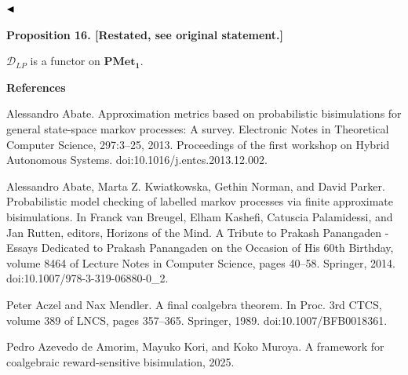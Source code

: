 \documentclass[10pt,a4paper]{article}
\begin{document}
$\hfill\blacktriangleleft$\par
 
 
 
 
\par\medskip\noindent\textbf{Proposition 16. [Restated, see original statement.]}\par
 
 
$\mathcal{D}_{LP}$ is a functor on $\mathbf{PMet_{1}}$.\par
 
 
 
 


 
\par\medskip\noindent\textbf{References}\par
  
\par\noindent  [1]  Alessandro Abate.  Approximation metrics based on probabilistic bisimulations for general state-space markov processes: A survey.  Electronic Notes in Theoretical Computer Science, 297:3–25, 2013.  Proceedings of the first workshop on Hybrid Autonomous Systems.  doi:10.1016/j.entcs.2013.12.002.  
 
\par\noindent  [2]  Alessandro Abate, Marta Z. Kwiatkowska, Gethin Norman, and David Parker.  Probabilistic model checking of labelled markov processes via finite approximate bisimulations.  In Franck van Breugel, Elham Kashefi, Catuscia Palamidessi, and Jan Rutten, editors, Horizons of the Mind. A Tribute to Prakash Panangaden - Essays Dedicated to Prakash Panangaden on the Occasion of His 60th Birthday, volume 8464 of Lecture Notes in Computer Science, pages 40–58. Springer, 2014.  doi:10.1007/978-3-319-06880-0\_2.  
 
\par\noindent  [3]  Peter Aczel and Nax Mendler.  A final coalgebra theorem.  In Proc. 3rd CTCS, volume 389 of LNCS, pages 357–365. Springer, 1989.  doi:10.1007/BFB0018361.  
 
\par\noindent  [4]  Pedro Azevedo de Amorim, Mayuko Kori, and Koko Muroya.  A framework for coalgebraic reward-sensitive bisimulation, 2025.  
 
\end{document}
